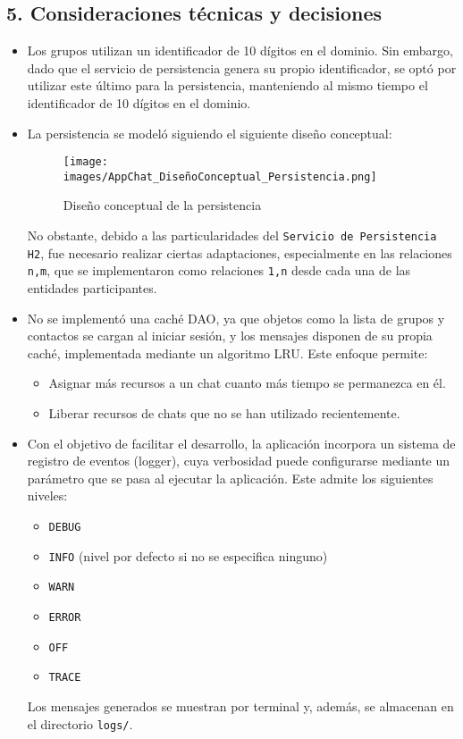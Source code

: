 \subsection*{5. Consideraciones técnicas y decisiones}
\begin{itemize}
    \item Los grupos utilizan un identificador de 10 dígitos en el dominio. Sin embargo, dado que el servicio de persistencia genera su propio identificador, se optó por utilizar este último para la persistencia, 
    manteniendo al mismo tiempo el identificador de 10 dígitos en el dominio.
    \item La persistencia se modeló siguiendo el siguiente diseño conceptual:
    \begin{figure}[H]
        \centering
        \begin{minipage}{0.85\textwidth}
            \centering
            \texttt{[image: images/AppChat\_DiseñoConceptual\_Persistencia.png]}
            \caption*{Diseño conceptual de la persistencia}
        \end{minipage}
    \end{figure}
    No obstante, debido a las particularidades del \texttt{Servicio de Persistencia H2}, fue necesario realizar ciertas adaptaciones, 
    especialmente en las relaciones \texttt{n,m}, que se implementaron como relaciones \texttt{1,n} desde cada una de las entidades participantes.
    \item No se implementó una caché DAO, ya que objetos como la lista de grupos y contactos se cargan al iniciar sesión, y los mensajes disponen de su propia caché, implementada mediante un algoritmo LRU. 
    Este enfoque permite:
    \begin{itemize}
        \item Asignar más recursos a un chat cuanto más tiempo se permanezca en él.
        \item Liberar recursos de chats que no se han utilizado recientemente.
    \end{itemize}
    \item Con el objetivo de facilitar el desarrollo, la aplicación incorpora un sistema de registro de eventos (logger), cuya verbosidad puede configurarse mediante un parámetro que se pasa al ejecutar la aplicación. 
    Este admite los siguientes niveles:
    \begin{itemize}
        \item \texttt{DEBUG}
        \item \texttt{INFO} (nivel por defecto si no se especifica ninguno)
        \item \texttt{WARN}
        \item \texttt{ERROR}
        \item \texttt{OFF}
        \item \texttt{TRACE}
    \end{itemize}
    Los mensajes generados se muestran por terminal y, además, se almacenan en el directorio \texttt{logs/}.

\end{itemize}


\newpage
